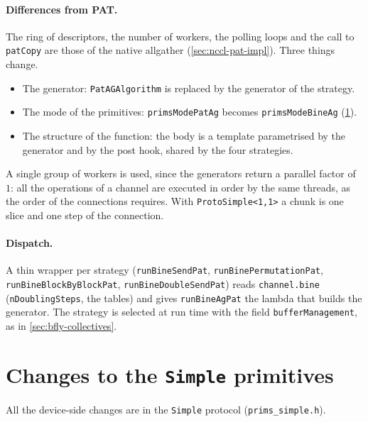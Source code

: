 \paragraph{Differences from PAT.}
The ring of descriptors, the number of workers, the polling loops and the call to \texttt{patCopy} are those of the native \pat{} allgather (\cref{sec:nccl-pat-impl}).
Three things change.
\begin{itemize}
  \item The generator: \texttt{PatAGAlgorithm} is replaced by the generator of the strategy.
  \item The mode of the primitives: \texttt{primsModePatAg} becomes \texttt{primsModeBineAg} (\cref{sec:pat-prims}).
  \item The structure of the function: the body is a template parametrised by the generator and by the post hook, shared by the four strategies.
\end{itemize}
A single group of workers is used, since the generators return a parallel factor of $1$: all the operations of a channel are executed in order by the same threads, as the order of the connections requires.
With \texttt{ProtoSimple<1,1>} a chunk is one slice and one step of the connection.

\paragraph{Dispatch.}
A thin wrapper per strategy (\texttt{runBineSend\brk{}Pat}, \texttt{runBinePermutation\brk{}Pat}, \texttt{runBineBlockBy\brk{}Block\brk{}Pat}, \texttt{runBineDoubleSend\brk{}Pat}) reads \texttt{channel.bine} (\texttt{nDoublingSteps}, the tables) and gives \texttt{runBineAgPat} the lambda that builds the generator.
The strategy is selected at run time with the field \texttt{bufferManagement}, as in \cref{sec:bfly-collectives}.

\section{Changes to the \texttt{Simple} primitives}\label{sec:pat-prims}

All the device-side changes are in the \texttt{Simple} protocol (\texttt{prims\_simple.h}).

